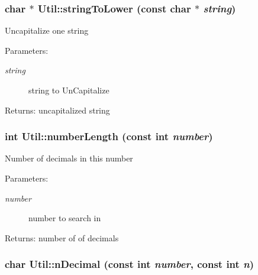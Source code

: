 \subsubsection{\setlength{\rightskip}{0pt plus 5cm}char $\ast$ Util::stringToLower (const char $\ast$ {\em string})\hspace{0.3cm}{\tt  [static]}}\label{classUtil_3cd22741e64b45f2f68aff09679b9f87}


Uncapitalize one string \begin{Desc}
\item[Parameters:]
\begin{description}
\item[{\em string}]string to UnCapitalize \end{description}
\end{Desc}
\begin{Desc}
\item[Returns:]uncapitalized string \end{Desc}
\subsubsection{\setlength{\rightskip}{0pt plus 5cm}int Util::numberLength (const int {\em number})\hspace{0.3cm}{\tt  [static]}}\label{classUtil_c40d5d12d6feae02fc04b36aafa4d803}


Number of decimals in this number \begin{Desc}
\item[Parameters:]
\begin{description}
\item[{\em number}]number to search in \end{description}
\end{Desc}
\begin{Desc}
\item[Returns:]number of of decimals \end{Desc}
\subsubsection{\setlength{\rightskip}{0pt plus 5cm}char Util::nDecimal (const int {\em number}, const int {\em n})\hspace{0.3cm}{\tt  [static]}}\label{classUtil_a837bc2354e998a7ff9429bbdf6b2eb4}



